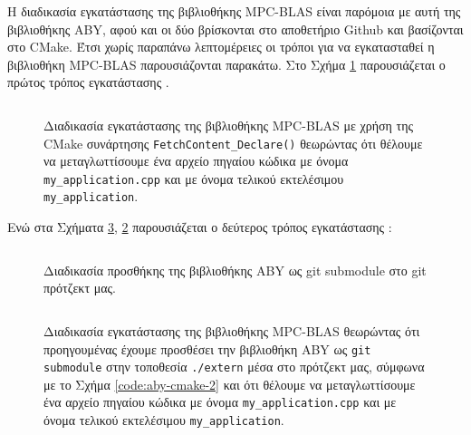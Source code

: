 Η διαδικασία εγκατάστασης της βιβλιοθήκης MPC-BLAS είναι παρόμοια με αυτή της βιβλιοθήκης ABY, αφού και οι δύο βρίσκονται στο αποθετήριο Github και βασίζονται στο CMake. Έτσι χωρίς παραπάνω λεπτομέρειες οι τρόποι για να εγκατασταθεί η βιβλιοθήκη MPC-BLAS παρουσιάζονται παρακάτω. Στο Σχήμα \ref{code:mpc-blas-1.cmake} παρουσιάζεται ο πρώτος τρόπος εγκατάστασης .

\begin{figure}[h!]
    \begin{center}
        \inputminted[fontsize=\scriptsize,frame=single]{cpp}{./01_body/code/mpc-blas-1.cmake}
    \end{center}
    \caption[Διαδικασία εγκατάστασης της βιβλιοθήκης MPC-BLAS με χρήση της CMake συνάρτησης \texttt{FetchContent_Declare()}]{Διαδικασία εγκατάστασης της βιβλιοθήκης MPC-BLAS με χρήση της CMake συνάρτησης \texttt{FetchContent_Declare()} θεωρώντας ότι θέλουμε να μεταγλωττίσουμε ένα αρχείο πηγαίου κώδικα με όνομα \texttt{my_application.cpp} και με όνομα τελικού εκτελέσιμου \texttt{my_application}.}
    \label{code:mpc-blas-1.cmake}
\end{figure}

Ενώ στα Σχήματα \ref{code:mpc-blas-2.cmake}, \ref{code:mpc-blas-installation} παρουσιάζεται ο δεύτερος τρόπος εγκατάστασης :

\begin{figure}[h!]
    \begin{center}
        \inputminted[fontsize=\scriptsize,frame=single]{cpp}{./01_body/code/mpc-blas-installation.sh}
    \end{center}
    \caption{Διαδικασία προσθήκης της βιβλιοθήκης ABY ως git submodule στο git πρότζεκτ μας.}
    \label{code:mpc-blas-installation}
\end{figure}

\begin{figure}[h!]
    \begin{center}
        \inputminted[fontsize=\scriptsize,frame=single]{cpp}{./01_body/code/mpc-blas-2.cmake}
    \end{center}
    \caption[Διαδικασία εγκατάστασης της βιβλιοθήκης με χρήση \texttt{git submodule}]{Διαδικασία εγκατάστασης της βιβλιοθήκης MPC-BLAS θεωρώντας ότι προηγουμένας έχουμε προσθέσει την βιβλιοθήκη ABY ως \texttt{git submodule} στην τοποθεσία \texttt{./extern} μέσα στο πρότζεκτ μας, σύμφωνα με το Σχήμα \ref{code:aby-cmake-2} και ότι θέλουμε να μεταγλωττίσουμε ένα αρχείο πηγαίου κώδικα με όνομα \texttt{my_application.cpp} και με όνομα τελικού εκτελέσιμου \texttt{my_application}.}
    \label{code:mpc-blas-2.cmake}
\end{figure}

